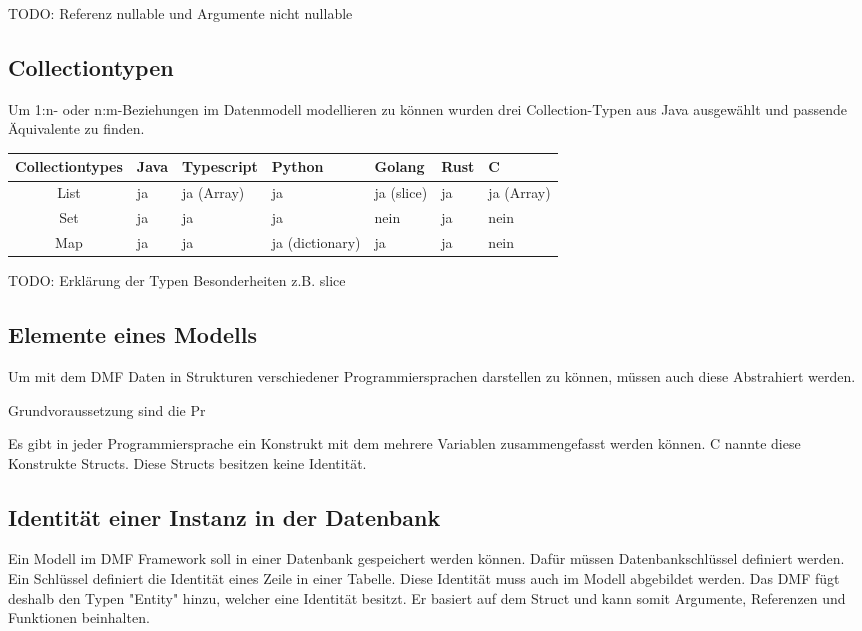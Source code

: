 \documentclass[./einleitung.tex]{subfiles}
\begin{document}
TODO:
Referenz nullable und Argumente nicht nullable

\subsection{Collectiontypen}
Um 1:n- oder n:m-Beziehungen im Datenmodell modellieren zu können wurden drei Collection-Typen aus Java ausgewählt und passende Äquivalente zu finden.
\begin{center}
\begin{tabular}{| c || m{3em} | m{4.5em} | m{5.5em} | m{4.5em} | m{3em} | m{4.5em} |}
\hline
Collectiontypes & Java & Typescript & Python & Golang & Rust & C \\
\hline
List & ja & ja (Array) & ja & ja (slice) & ja & ja (Array) \\
\hline
Set & ja & ja & ja & nein & ja & nein \\
\hline
Map & ja & ja & ja (dictionary)& ja & ja & nein \\
\hline

\end{tabular}
\end{center}

TODO: Erklärung der Typen
Besonderheiten z.B. slice

\subsection{Elemente eines Modells}
Um mit dem DMF Daten in Strukturen verschiedener Programmiersprachen darstellen zu können, müssen auch diese Abstrahiert werden.

Grundvoraussetzung sind die Pr

Es gibt in jeder Programmiersprache ein Konstrukt mit dem mehrere Variablen zusammengefasst werden können. C nannte diese Konstrukte Structs. Diese Structs besitzen keine Identität.

\subsection{Identität einer Instanz in der Datenbank}
Ein Modell im DMF Framework soll in einer Datenbank gespeichert werden können.
Dafür müssen Datenbankschlüssel definiert werden. Ein Schlüssel definiert die Identität eines Zeile in einer Tabelle.
Diese Identität muss auch im Modell abgebildet werden.
Das DMF fügt deshalb den Typen "Entity" hinzu, welcher eine Identität besitzt. Er basiert auf dem Struct und kann somit Argumente, Referenzen und Funktionen beinhalten.
\end{document}
